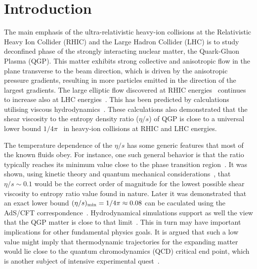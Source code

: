 
\section{Introduction}


The main emphasis of the ultra-relativistic heavy-ion collisions at the Relativistic Heavy Ion Collider (RHIC) and the Large Hadron Collider (LHC) is to study deconfined phase of the strongly interacting nuclear matter, the Quark-Gluon Plasma (QGP). 
This matter exhibits strong collective and anisotropic flow in the plane transverse to the beam direction, which is driven by the anisotropic pressure gradients, resulting in more particles emitted in the direction of the largest gradients.
The large elliptic flow discovered at RHIC energies~\cite{Ackermann:2000tr} continues to increase also at LHC energies~\cite{Aamodt:2010pa,Adam:2016izf}. This has been predicted by calculations utilising viscous hydrodynamics~\cite{Romatschke:2007mq,Shen:2011eg,Schenke:2011zz,Bozek:2012qs,Gale:2012rq,Hirano:2010je}.
These calculations also demonstrated that the shear viscosity to the entropy density ratio ($\eta/s$) of QGP is close to a universal lower bound $1/4\pi$~\cite{Kovtun:2004de} in heavy-ion collisions at RHIC and LHC energies.

The temperature dependence of the $\eta/s$ has some generic features that most of the known fluids obey. For instance, one such general behavior is that the ratio typically reaches its minimum value close to the phase transition region~\cite{Lacey:2006bc}. 
It was shown, using kinetic theory and quantum mechanical considerations~\cite{PhysRevD.31.53}, that $\eta/s\sim0.1$ would be the correct order of magnitude for the lowest possible shear viscosity to entropy ratio value found in nature. Later it was demonstrated that an exact lower bound $(\eta/s)_{\rm min}=1/4\pi\approx0.08$ can be caculated using the AdS/CFT correspondence~\cite{Kovtun:2004de}. Hydrodynamical simulations support as well the view that the QGP matter is close to that limit~\cite{Gale:2012rq}. This in turn may have important implications for other fundamental physics goals. It is argued that such a low value might imply that thermodynamic trajectories for the expanding matter would lie close to the quantum chromodynamics (QCD) critical end point, which is another subject of intensive experimental quest~\cite{Lacey:2006bc}.

